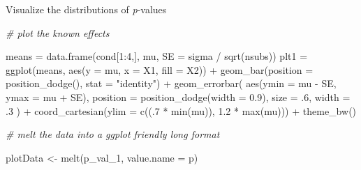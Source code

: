\documentclass[
]{book}
\newenvironment{Shaded}{\begin{snugshade}}{\end{snugshade}}
\newcommand{\AttributeTok}[1]{\textcolor[rgb]{0.77,0.63,0.00}{#1}}
\newcommand{\CommentTok}[1]{\textcolor[rgb]{0.56,0.35,0.01}{\textit{#1}}}
\newcommand{\DecValTok}[1]{\textcolor[rgb]{0.00,0.00,0.81}{#1}}
\newcommand{\FloatTok}[1]{\textcolor[rgb]{0.00,0.00,0.81}{#1}}
\newcommand{\FunctionTok}[1]{\textcolor[rgb]{0.00,0.00,0.00}{#1}}
\newcommand{\NormalTok}[1]{#1}
\newcommand{\OtherTok}[1]{\textcolor[rgb]{0.56,0.35,0.01}{#1}}
\newcommand{\SpecialCharTok}[1]{\textcolor[rgb]{0.00,0.00,0.00}{#1}}
\newcommand{\StringTok}[1]{\textcolor[rgb]{0.31,0.60,0.02}{#1}}
\begin{document}
Visualize the distributions of \emph{p}-values

\begin{Shaded}
\begin{Highlighting}[]
\CommentTok{\# plot the known effects}

 
\NormalTok{means }\OtherTok{=} \FunctionTok{data.frame}\NormalTok{(cond[}\DecValTok{1}\SpecialCharTok{:}\DecValTok{4}\NormalTok{,], mu, }\AttributeTok{SE =}\NormalTok{ sigma }\SpecialCharTok{/} \FunctionTok{sqrt}\NormalTok{(nsubs))}
\NormalTok{plt1 }\OtherTok{=} \FunctionTok{ggplot}\NormalTok{(means, }\FunctionTok{aes}\NormalTok{(}\AttributeTok{y =}\NormalTok{ mu, }\AttributeTok{x =}\NormalTok{ X1, }\AttributeTok{fill =}\NormalTok{ X2)) }\SpecialCharTok{+}
\FunctionTok{geom\_bar}\NormalTok{(}\AttributeTok{position =} \FunctionTok{position\_dodge}\NormalTok{(), }\AttributeTok{stat =} \StringTok{"identity"}\NormalTok{) }\SpecialCharTok{+}
\FunctionTok{geom\_errorbar}\NormalTok{(}
\FunctionTok{aes}\NormalTok{(}\AttributeTok{ymin =}\NormalTok{ mu }\SpecialCharTok{{-}}\NormalTok{ SE, }\AttributeTok{ymax =}\NormalTok{ mu }\SpecialCharTok{+}\NormalTok{ SE),}
\AttributeTok{position =} \FunctionTok{position\_dodge}\NormalTok{(}\AttributeTok{width =} \FloatTok{0.9}\NormalTok{),}
\AttributeTok{size =}\NormalTok{ .}\DecValTok{6}\NormalTok{,}
\AttributeTok{width =}\NormalTok{ .}\DecValTok{3}
\NormalTok{) }\SpecialCharTok{+}
\FunctionTok{coord\_cartesian}\NormalTok{(}\AttributeTok{ylim =} \FunctionTok{c}\NormalTok{((.}\DecValTok{7} \SpecialCharTok{*} \FunctionTok{min}\NormalTok{(mu)), }\FloatTok{1.2} \SpecialCharTok{*} \FunctionTok{max}\NormalTok{(mu))) }\SpecialCharTok{+}
\FunctionTok{theme\_bw}\NormalTok{()}

\CommentTok{\# melt the data into a ggplot friendly \textquotesingle{}long\textquotesingle{} format}

\NormalTok{plotData }\OtherTok{\textless{}{-}} \FunctionTok{melt}\NormalTok{(p\_val\_1, }\AttributeTok{value.name =} \StringTok{\textquotesingle{}p\textquotesingle{}}\NormalTok{)}


\end{Highlighting}
\end{Shaded}
\end{document}
